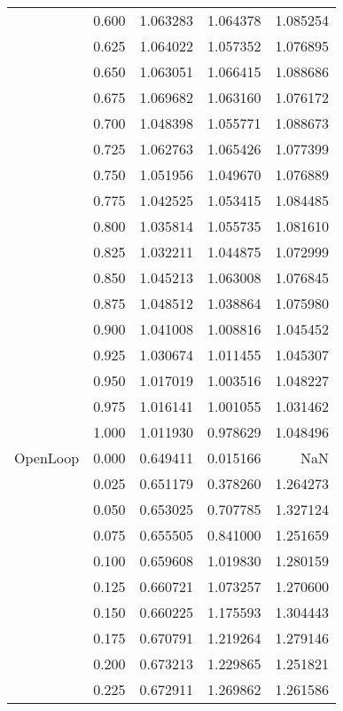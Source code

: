 \begin{tabular}{llrrr}
         & 0.600 &   1.063283 &   1.064378 &   1.085254 \\
         & 0.625 &   1.064022 &   1.057352 &   1.076895 \\
         & 0.650 &   1.063051 &   1.066415 &   1.088686 \\
         & 0.675 &   1.069682 &   1.063160 &   1.076172 \\
         & 0.700 &   1.048398 &   1.055771 &   1.088673 \\
         & 0.725 &   1.062763 &   1.065426 &   1.077399 \\
         & 0.750 &   1.051956 &   1.049670 &   1.076889 \\
         & 0.775 &   1.042525 &   1.053415 &   1.084485 \\
         & 0.800 &   1.035814 &   1.055735 &   1.081610 \\
         & 0.825 &   1.032211 &   1.044875 &   1.072999 \\
         & 0.850 &   1.045213 &   1.063008 &   1.076845 \\
         & 0.875 &   1.048512 &   1.038864 &   1.075980 \\
         & 0.900 &   1.041008 &   1.008816 &   1.045452 \\
         & 0.925 &   1.030674 &   1.011455 &   1.045307 \\
         & 0.950 &   1.017019 &   1.003516 &   1.048227 \\
         & 0.975 &   1.016141 &   1.001055 &   1.031462 \\
         & 1.000 &   1.011930 &   0.978629 &   1.048496 \\
OpenLoop & 0.000 &   0.649411 &   0.015166 &        NaN \\
         & 0.025 &   0.651179 &   0.378260 &   1.264273 \\
         & 0.050 &   0.653025 &   0.707785 &   1.327124 \\
         & 0.075 &   0.655505 &   0.841000 &   1.251659 \\
         & 0.100 &   0.659608 &   1.019830 &   1.280159 \\
         & 0.125 &   0.660721 &   1.073257 &   1.270600 \\
         & 0.150 &   0.660225 &   1.175593 &   1.304443 \\
         & 0.175 &   0.670791 &   1.219264 &   1.279146 \\
         & 0.200 &   0.673213 &   1.229865 &   1.251821 \\
         & 0.225 &   0.672911 &   1.269862 &   1.261586 \\

\end{tabular}
